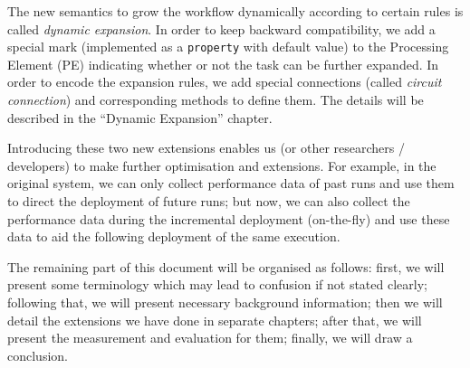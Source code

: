 The new semantics to grow the workflow dynamically according to certain rules is called \emph{dynamic expansion}. In order to keep backward compatibility, we add a special mark (implemented as a \lstinline|property| with default value) to the Processing Element (PE) indicating whether or not the task can be further expanded. In order to encode the expansion rules, we add special connections (called \emph{circuit connection}) and corresponding methods to define them. The details will be described in the ``Dynamic Expansion'' chapter.

Introducing these two new extensions enables us (or other researchers / developers) to make further optimisation and extensions. For example, in the original \dpy system, we can only collect performance data of past runs and use them to direct the deployment of future runs; but now, we can also collect the performance data during the incremental deployment (\ie on-the-fly) and use these data to aid the following deployment of the same execution.

The remaining part of this document will be organised as follows: first, we will present some terminology which may lead to confusion if not stated clearly; following that, we will present necessary background information; then we will detail the extensions we have done in separate chapters; after that, we will present the measurement and evaluation for them; finally, we will draw a conclusion.
